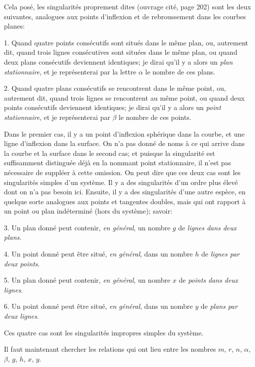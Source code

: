 \documentclass[11pt]{article}
\begin{document}
Cela pos\'e, les singularit\'es proprement dites (ouvrage cit\'e, page 202) sont les deux suivantes, analogues aux points d'inflexion et de rebroussement dans les courbes planes:

1. Quand quatre points cons\'ecutifs sont situ\'es dans le m\^eme plan, ou, autrement dit, quand trois lignes cons\'ecutives sont situ\'ees dans le m\^eme plan, ou quand deux plans cons\'ecutifs deviennent identiques; je dirai qu'il y a alors un \textit{plan stationnaire}, et je repr\'esenterai par la lettre $\alpha$ le nombre de ces plans.

2. Quand quatre plans cons\'ecutifs se rencontrent dans le m\^eme point, ou, autrement dit, quand trois lignes se rencontrent au m\^eme point, ou quand deux points cons\'ecutifs deviennent identiques; je dirai qu'il y a alors un \textit{point stationnaire}, et je repr\'esenterai par $\beta$ le nombre de ces points.

Dans le premier cas, il y a un point d'inflexion sph\'erique dans la courbe, et une ligne d'inflexion dans la surface. On n'a pas donn\'e de noms \`a ce qui arrive dans la courbe et la surface dans le second cas; et puisque la singularit\'e est suffisamment distingu\'ee d\'ej\`a en la nommant point stationnaire, il n'est pas n\'ecessaire de suppl\'eer \`a cette omission. On peut dire que ces deux cas sont les singularit\'es simples d'un syst\`eme. Il y a des singularit\'es d'un ordre plus \'elev\'e dont on n'a pas besoin ici. Ensuite, il y a des singularit\'es d'une autre esp\`ece, en quelque sorte analogues aux points et tangentes doubles, mais qui ont rapport \`a un point ou plan ind\'etermin\'e (hors du syst\`eme); savoir:

3. Un plan donn\'e peut contenir, \textit{en g\'en\'eral}, un nombre $g$ de \textit{lignes dans deux plans}.

4. Un point donn\'e peut \^etre situ\'e, \textit{en g\'en\'eral}, dans un nombre $h$ de \textit{lignes par deux points}.

5. Un plan donn\'e peut contenir, \textit{en g\'en\'eral}, un nombre $x$ de \textit{points dans deux lignes}.

6. Un point donn\'e peut \^etre situ\'e, \textit{en g\'en\'eral}, dans un nombre $y$ de \textit{plans par deux lignes}.

Ces quatre cas sont les singularit\'es impropres simples du syst\`eme.

Il faut maintenant chercher les relations qui ont lieu entre les nombres $m$, $r$, $n$, $\alpha$, $\beta$, $g$, $h$, $x$, $y$.
\end{document}
